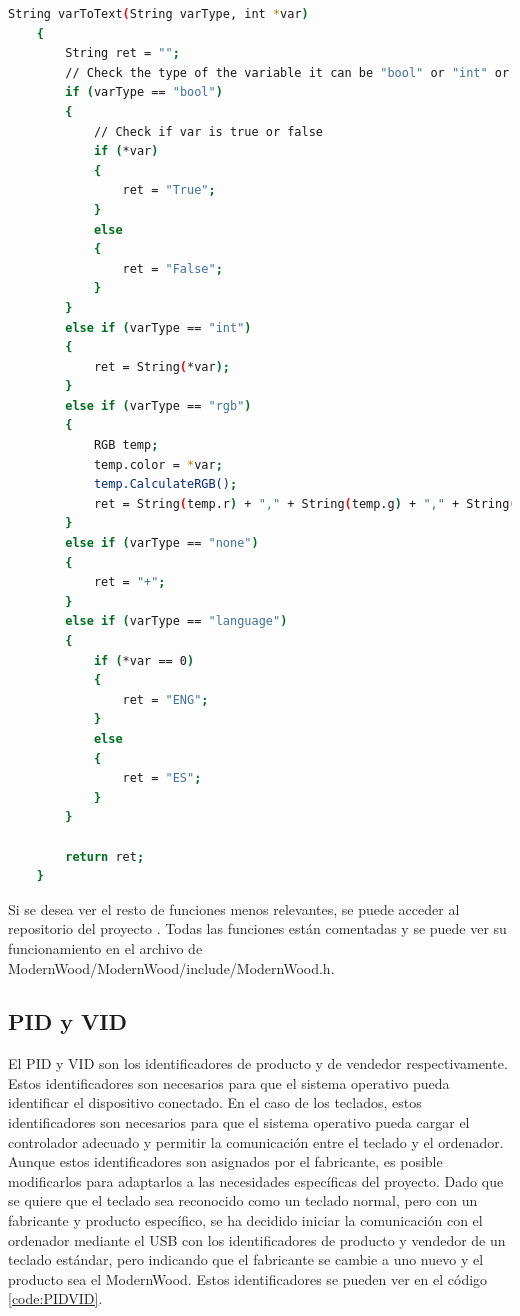 \begin{lstlisting}[style=console, language=bash, caption={Funciones para mostrar y editar las variables de le \gls{EEPROM}}, label={code:ConfigEEPROM}]
    String varToText(String varType, int *var)
    {
        String ret = "";
        // Check the type of the variable it can be "bool" or "int" or "rgb" or "none"
        if (varType == "bool")
        {
            // Check if var is true or false
            if (*var)
            {
                ret = "True";
            }
            else
            {
                ret = "False";
            }
        }
        else if (varType == "int")
        {
            ret = String(*var);
        }
        else if (varType == "rgb")
        {
            RGB temp;
            temp.color = *var;
            temp.CalculateRGB();
            ret = String(temp.r) + "," + String(temp.g) + "," + String(temp.b);
        }
        else if (varType == "none")
        {
            ret = "+";
        }
        else if (varType == "language")
        {
            if (*var == 0)
            {
                ret = "ENG";
            }
            else
            {
                ret = "ES";
            }
        }

        return ret;
    }
\end{lstlisting}

Si se desea ver el resto de funciones menos relevantes, se puede acceder al repositorio del proyecto \cite{ModernWoodGitHub}. Todas las funciones están comentadas y se puede ver su funcionamiento en el archivo de ModernWood/ModernWood/include/ModernWood.h.

\subsection{PID y VID}\label{ApendicePIDVID}

El \gls{PID} y \gls{VID} son los identificadores de producto y de vendedor respectivamente. Estos identificadores son necesarios para que el sistema operativo pueda identificar el dispositivo conectado. En el caso de los teclados, estos identificadores son necesarios para que el sistema operativo pueda cargar el controlador adecuado y permitir la comunicación entre el teclado y el ordenador. Aunque estos identificadores son asignados por el fabricante, es posible modificarlos para adaptarlos a las necesidades específicas del proyecto. Dado que se quiere que el teclado sea reconocido como un teclado normal, pero con un fabricante y producto específico, se ha decidido iniciar la comunicación con el ordenador mediante el \gls{USB} con los identificadores de producto y vendedor de un teclado estándar, pero indicando que el fabricante se cambie a uno nuevo y el producto sea el ModernWood. Estos identificadores se pueden ver en el código \ref{code:PIDVID}.

